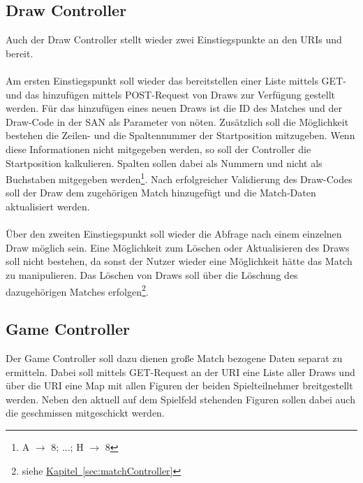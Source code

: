 \subsection{Draw Controller}\label{sec:drawController}
Auch der Draw Controller stellt wieder zwei Einstiegspunkte an den \glspl{URI}  und  bereit. \\
\\
Am ersten Einstiegspunkt soll wieder das bereitstellen einer Liste mittels GET- und das hinzufügen mittels POST-Request von Draws zur Verfügung gestellt werden. Für das hinzufügen eines neuen Draws ist die ID des Matches und der Draw-Code in der \gls{SAN} als Parameter von nöten. Zusätzlich soll die Möglichkeit bestehen die Zeilen- und die Spaltennummer der Startposition mitzugeben. Wenn diese Informationen nicht mitgegeben werden, so soll der Controller die Startposition kalkulieren. Spalten sollen dabei als Nummern und nicht als Buchstaben mitgegeben werden\footnote{A $\rightarrow$ 8; ...; H $\rightarrow$ 8}. Nach erfolgreicher Validierung des Draw-Codes soll der Draw dem zugehörigen Match hinzugefügt und die Match-Daten aktualisiert werden.\\
\\
Über den zweiten Einstiegspunkt soll wieder die Abfrage nach einem einzelnen Draw möglich sein. Eine Möglichkeit zum Löschen oder Aktualisieren des Draws soll nicht bestehen, da sonst der Nutzer wieder eine Möglichkeit hätte das Match zu manipulieren. Das Löschen von Draws soll über die Löschung des dazugehörigen Matches erfolgen\footnote{siehe \hyperref[sec:matchController]{Kapitel~\ref{sec:matchController}}}.

\subsection{Game Controller}\label{sec:gameController}
Der Game Controller soll dazu dienen große Match bezogene Daten separat zu ermitteln. Dabei soll mittels GET-Request an der \gls{URI}  eine Liste aller Draws und über die \gls{URI}  eine Map mit allen Figuren der beiden Spielteilnehmer breitgestellt werden. Neben den aktuell auf dem Spielfeld stehenden Figuren sollen dabei auch die geschmissen mitgeschickt werden.
